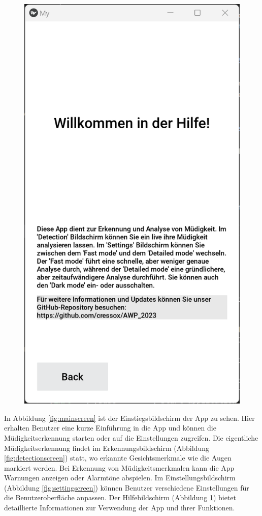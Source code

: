 \begin{figure}[h]
\begin{minipage}[b]{0.22\textwidth}
		\includegraphics[width=\linewidth]{images/helpscreen.png}
		\caption{}
		\label{fig:helpscreen}
	\end{minipage}
\end{figure}

In Abbildung \ref{fig:mainscreen} ist der Einstiegsbildschirm der App zu sehen. Hier erhalten Benutzer eine kurze Einführung in die App und können die Müdigkeitserkennung starten oder auf die Einstellungen zugreifen. Die eigentliche Müdigkeitserkennung findet im Erkennungsbildschirm (Abbildung \ref{fig:detectionscreen}) statt, wo erkannte Gesichtsmerkmale wie die Augen markiert werden. Bei Erkennung von Müdigkeitsmerkmalen kann die App Warnungen anzeigen oder Alarmtöne abspielen. Im Einstellungsbildschirm (Abbildung \ref{fig:settingscreen}) können Benutzer verschiedene Einstellungen für die Benutzeroberfläche anpassen. Der Hilfebildschirm (Abbildung \ref{fig:helpscreen}) bietet detaillierte Informationen zur Verwendung der App und ihrer Funktionen.

